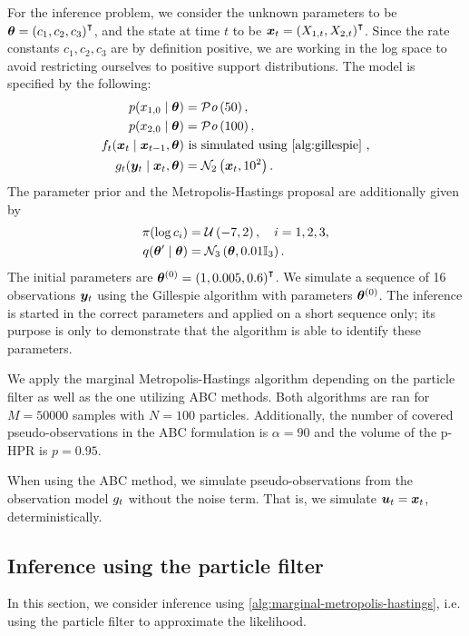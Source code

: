 For the inference problem, we consider the unknown parameters to be $\bm{\theta} = \left(c_1, c_2, c_3\right)^\intercal$, and the state at time $t$ to be $\bm{x}_t = \left(X_{1,t}, X_{2,t}\right)^\intercal$. Since the rate constants $c_1, c_2, c_3$ are by definition positive, we are working in the log space to avoid restricting ourselves to positive support distributions. The model is specified by the following:
\begin{equation*}
\begin{split}
\sprior(x_{1,0} \mid \btheta) &= \mathcal{P}\mathit{o}\left(50\right), \\
\sprior(x_{2,0} \mid \btheta) &= \mathcal{P}\mathit{o}\left(100\right), \\
\trans_t(\bx_t \mid \bx_{t-1}, \btheta) & \text{ is simulated using \autoref{alg:gillespie} }, \\
\obs_t(\by_t \mid \bx_{t}, \btheta) &= \mathcal{N}_2\left(\bx_t, 10^2\right).
\end{split}
\end{equation*}
The parameter prior and the Metropolis-Hastings proposal are additionally given by
\begin{equation*}
\begin{split}
\pi(\log c_i) &= \mathcal{U}\left(-7, 2\right), \quad i = 1, 2, 3, \\
q(\bm{\theta}^\prime \mid \bm{\theta}) &= \mathcal{N}_3\left(\bm{\theta}, 0.01 \mathbb{I}_3\right).
\end{split}
\end{equation*}
The initial parameters are $\bm{\theta}^{(0)} = \left(1, 0.005, 0.6\right)^\intercal$. We simulate a sequence of 16 observations $\bm{y}_t$ using the Gillespie algorithm with parameters $\bm{\theta}^{(0)}$. The inference is started in the correct parameters and applied on a short sequence only; its purpose is only to demonstrate that the algorithm is able to identify these parameters.

We apply the marginal Metropolis-Hastings algorithm depending on the particle filter as well as the one utilizing ABC methods. Both algorithms are ran for $M = 50000$ samples with $N = 100$ particles. Additionally, the number of covered pseudo-observations in the ABC formulation is $\alpha = 90$ and the volume of the p-HPR is $p = 0.95$.

When using the ABC method, we simulate pseudo-observations from the observation model $g_t$ without the noise term. That is, we simulate $\bm{u}_t = \bm{x}_t$, deterministically.

\subsection{Inference using the particle filter}
In this section, we consider inference using \autoref{alg:marginal-metropolis-hastings}, i.e. using the particle filter to approximate the likelihood.

